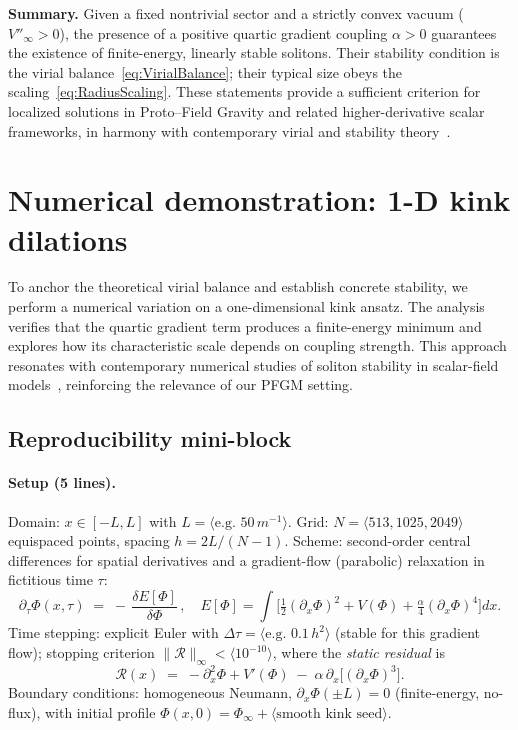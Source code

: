 \documentclass{article}
\begin{document}
\textbf{Summary.}
Given a fixed nontrivial sector and a strictly convex vacuum ($V''_\infty>0$), the presence of a positive quartic gradient coupling $\alpha>0$ guarantees the existence of finite-energy, linearly stable solitons. Their stability condition is the virial balance~\eqref{eq:VirialBalance}; their typical size obeys the scaling~\eqref{eq:RadiusScaling}. These statements provide a sufficient criterion for localized solutions in Proto–Field Gravity and related higher-derivative scalar frameworks, in harmony with contemporary virial and stability theory~\cite{Pombo2024_Virial,Germain2024_Review}.


\section{Numerical demonstration: 1-D kink dilations}
\label{sec:numerics}

To anchor the theoretical virial balance and establish concrete stability, we perform a numerical variation on a one-dimensional kink ansatz. The analysis verifies that the quartic gradient term produces a finite-energy minimum and explores how its characteristic scale depends on coupling strength. This approach resonates with contemporary numerical studies of soliton stability in scalar-field models~\cite{GonzalezLopez2025_KinkStability,Allamon2025_NumericalSolitons}, reinforcing the relevance of our PFGM setting.

\subsection{Reproducibility mini-block}
\label{sec:numerics-repro}

\paragraph{Setup (5 lines).}
Domain: $x\in[-L,L]$ with $L=\langle \text{e.g.\ }50\,m^{-1}\rangle$. 
Grid: $N=\langle 513,1025,2049\rangle$ equispaced points, spacing $h=2L/(N-1)$. 
Scheme: second-order central differences for spatial derivatives and a gradient-flow (parabolic) relaxation in fictitious time $\tau$:
\[
\partial_\tau \Phi(x,\tau) \;=\; -\,\frac{\delta E[\Phi]}{\delta \Phi}\,,
\quad
E[\Phi]=\int\!\Big[\tfrac12(\partial_x\Phi)^2+V(\Phi)+\tfrac{\alpha}{4}(\partial_x\Phi)^4\Big]dx.
\]
Time stepping: explicit Euler with $\Delta\tau=\langle \text{e.g.\ }0.1\,h^2\rangle$ (stable for this gradient flow); stopping criterion $\|\mathcal{R}\|_\infty<\langle 10^{-10}\rangle$, where the \emph{static residual} is
\[
\mathcal{R}(x)\;=\;-\partial_x^2\Phi + V'(\Phi)
\;-\;\alpha\,\partial_x\!\Big[(\partial_x\Phi)^3\Big].
\]
Boundary conditions: homogeneous Neumann, $\partial_x\Phi(\pm L)=0$ (finite-energy, no-flux), with initial profile $\Phi(x,0)=\Phi_\infty+\langle \text{smooth kink seed}\rangle$.
\end{document}
